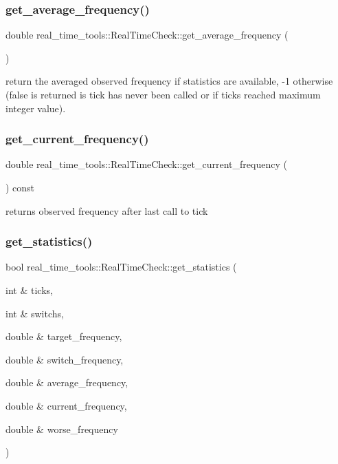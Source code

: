\subsubsection{\texorpdfstring{get\+\_\+average\+\_\+frequency()}{get\_average\_frequency()}}
{\footnotesize\ttfamily double real\+\_\+time\+\_\+tools\+::\+Real\+Time\+Check\+::get\+\_\+average\+\_\+frequency (\begin{DoxyParamCaption}{ }\end{DoxyParamCaption})}

return the averaged observed frequency if statistics are available, -\/1 otherwise (false is returned is tick has never been called or if ticks reached maximum integer value). \mbox{\label{classreal__time__tools_1_1RealTimeCheck_a375f76a8df6a08ea1755728391384302}} 
\subsubsection{\texorpdfstring{get\+\_\+current\+\_\+frequency()}{get\_current\_frequency()}}
{\footnotesize\ttfamily double real\+\_\+time\+\_\+tools\+::\+Real\+Time\+Check\+::get\+\_\+current\+\_\+frequency (\begin{DoxyParamCaption}{ }\end{DoxyParamCaption}) const}

returns observed frequency after last call to tick \mbox{\label{classreal__time__tools_1_1RealTimeCheck_a4d9614b08d2b4bf7162e14c473b7d491}} 
\subsubsection{\texorpdfstring{get\+\_\+statistics()}{get\_statistics()}}
{\footnotesize\ttfamily bool real\+\_\+time\+\_\+tools\+::\+Real\+Time\+Check\+::get\+\_\+statistics (\begin{DoxyParamCaption}\item[{int \&}]{ticks,  }\item[{int \&}]{switchs,  }\item[{double \&}]{target\+\_\+frequency,  }\item[{double \&}]{switch\+\_\+frequency,  }\item[{double \&}]{average\+\_\+frequency,  }\item[{double \&}]{current\+\_\+frequency,  }\item[{double \&}]{worse\+\_\+frequency }\end{DoxyParamCaption})}

